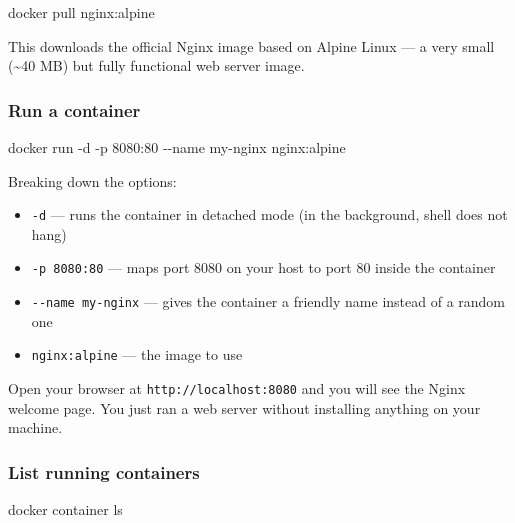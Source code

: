\documentclass[11pt,american,a4paper,openany]{book}
\providecommand{\tightlist}{%
  \setlength{\itemsep}{2pt}\setlength{\parskip}{0pt}}
\newenvironment{Shaded}{}{}
\newcommand{\NormalTok}[1]{#1}
\begin{document}
\begin{Shaded}
\begin{Highlighting}[]
\NormalTok{docker pull nginx:alpine}
\end{Highlighting}
\end{Shaded}

This downloads the official Nginx image based on Alpine Linux --- a very
small (\textasciitilde40 MB) but fully functional web server image.

\subsubsection{Run a container}\label{run-a-container}

\begin{Shaded}
\begin{Highlighting}[]
\NormalTok{docker run {-}d {-}p 8080:80 {-}{-}name my{-}nginx nginx:alpine}
\end{Highlighting}
\end{Shaded}

Breaking down the options:

\begin{itemize}
\tightlist
\item
  \texttt{-d} --- runs the container in detached mode (in the
  background, shell does not hang)
\item
  \texttt{-p\ 8080:80} --- maps port 8080 on your host to port 80 inside
  the container
\item
  \texttt{-\/-name\ my-nginx} --- gives the container a friendly name
  instead of a random one
\item
  \texttt{nginx:alpine} --- the image to use
\end{itemize}

Open your browser at \texttt{http://localhost:8080} and you will see the
Nginx welcome page. You just ran a web server without installing
anything on your machine.

\subsubsection{List running containers}\label{list-running-containers}

\begin{Shaded}
\begin{Highlighting}[]
\NormalTok{docker container ls}
\end{Highlighting}
\end{Shaded}
\end{document}

